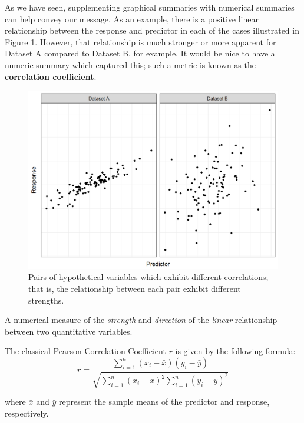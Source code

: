 \documentclass[]{book}
\theoremstyle{plain}
\theoremstyle{mydefn}
\theoremstyle{myexmpl}
\theoremstyle{remark}
\let\BeginKnitrBlock\begin \let\EndKnitrBlock\end
\let\BeginKnitrBlock\begin \let\EndKnitrBlock\end
\begin{document}
As we have seen, supplementing graphical summaries with numerical
summaries can help convey our message. As an example, there is a
positive linear relationship between the response and predictor in each
of the cases illustrated in Figure \ref{fig:regsummaries-correlation}.
However, that relationship is much stronger or more apparent for Dataset
A compared to Dataset B, for example. It would be nice to have a numeric
summary which captured this; such a metric is known as the
\textbf{correlation coefficient}.

\begin{figure}

{\centering \includegraphics[width=0.8\linewidth]{./Images/regsummaries-correlation-1} 

}

\caption{Pairs of hypothetical variables which exhibit different correlations; that is, the relationship between each pair exhibit different strengths.}\label{fig:regsummaries-correlation}
\end{figure}

\BeginKnitrBlock{definition}[Correlation Coefficient]
\protect\hypertarget{def:defn-correlation-coefficient}{}{\label{def:defn-correlation-coefficient}
{} }A numerical measure of the
\emph{strength} and \emph{direction} of the \emph{linear} relationship
between two quantitative variables.

The classical Pearson Correlation Coefficient \(r\) is given by the
following formula:
\[r = \frac{\sum_{i=1}^{n} \left(x_i - \bar{x}\right)\left(y_i - \bar{y}\right)}{\sqrt{\sum_{i=1}^n \left(x_i - \bar{x}\right)^2 \sum_{i=1}^n \left(y_i - \bar{y}\right)^2}}\]

where \(\bar{x}\) and \(\bar{y}\) represent the sample means of the
predictor and response, respectively.
\EndKnitrBlock{definition}
\end{document}
